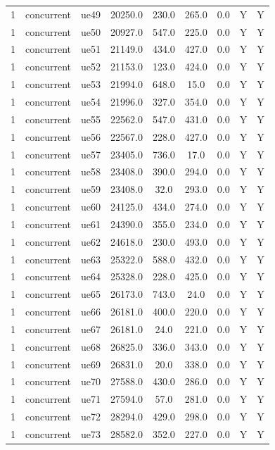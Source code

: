 \begin{table}[ht]
\begin{tabular}{|c|c|c|c|c|c|c|c|c|}
1 & concurrent & ue49 & 20250.0 & 230.0 & 265.0 & 0.0 & Y & Y \\
1 & concurrent & ue50 & 20927.0 & 547.0 & 225.0 & 0.0 & Y & Y \\
1 & concurrent & ue51 & 21149.0 & 434.0 & 427.0 & 0.0 & Y & Y \\
1 & concurrent & ue52 & 21153.0 & 123.0 & 424.0 & 0.0 & Y & Y \\
1 & concurrent & ue53 & 21994.0 & 648.0 & 15.0 & 0.0 & Y & Y \\
1 & concurrent & ue54 & 21996.0 & 327.0 & 354.0 & 0.0 & Y & Y \\
1 & concurrent & ue55 & 22562.0 & 547.0 & 431.0 & 0.0 & Y & Y \\
1 & concurrent & ue56 & 22567.0 & 228.0 & 427.0 & 0.0 & Y & Y \\
1 & concurrent & ue57 & 23405.0 & 736.0 & 17.0 & 0.0 & Y & Y \\
1 & concurrent & ue58 & 23408.0 & 390.0 & 294.0 & 0.0 & Y & Y \\
1 & concurrent & ue59 & 23408.0 & 32.0 & 293.0 & 0.0 & Y & Y \\
1 & concurrent & ue60 & 24125.0 & 434.0 & 274.0 & 0.0 & Y & Y \\
1 & concurrent & ue61 & 24390.0 & 355.0 & 234.0 & 0.0 & Y & Y \\
1 & concurrent & ue62 & 24618.0 & 230.0 & 493.0 & 0.0 & Y & Y \\
1 & concurrent & ue63 & 25322.0 & 588.0 & 432.0 & 0.0 & Y & Y \\
1 & concurrent & ue64 & 25328.0 & 228.0 & 425.0 & 0.0 & Y & Y \\
1 & concurrent & ue65 & 26173.0 & 743.0 & 24.0 & 0.0 & Y & Y \\
1 & concurrent & ue66 & 26181.0 & 400.0 & 220.0 & 0.0 & Y & Y \\
1 & concurrent & ue67 & 26181.0 & 24.0 & 221.0 & 0.0 & Y & Y \\
1 & concurrent & ue68 & 26825.0 & 336.0 & 343.0 & 0.0 & Y & Y \\
1 & concurrent & ue69 & 26831.0 & 20.0 & 338.0 & 0.0 & Y & Y \\
1 & concurrent & ue70 & 27588.0 & 430.0 & 286.0 & 0.0 & Y & Y \\
1 & concurrent & ue71 & 27594.0 & 57.0 & 281.0 & 0.0 & Y & Y \\
1 & concurrent & ue72 & 28294.0 & 429.0 & 298.0 & 0.0 & Y & Y \\
1 & concurrent & ue73 & 28582.0 & 352.0 & 227.0 & 0.0 & Y & Y \\

\end{tabular}
\end{table}
